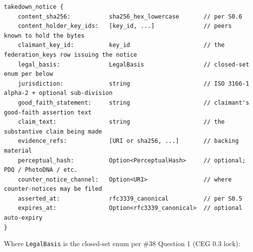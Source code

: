 \documentclass[11pt]{article}
\begin{document}
\begin{lstlisting}
takedown_notice {
    content_sha256:           sha256_hex_lowercase       // per S0.6
    content_holder_key_ids:   [key_id, ...]              // peers known to hold the bytes
    claimant_key_id:          key_id                     // the federation_keys row issuing the notice
    legal_basis:              LegalBasis                 // closed-set enum per below
    jurisdiction:             string                     // ISO 3166-1 alpha-2 + optional sub-division
    good_faith_statement:     string                     // claimant's good-faith assertion text
    claim_text:               string                     // the substantive claim being made
    evidence_refs:            [URI or sha256, ...]       // backing material
    perceptual_hash:          Option<PerceptualHash>     // optional; PDQ / PhotoDNA / etc.
    counter_notice_channel:   Option<URI>                // where counter-notices may be filed
    asserted_at:              rfc3339_canonical          // per S0.5
    expires_at:               Option<rfc3339_canonical>  // optional auto-expiry
}
\end{lstlisting}

Where \texttt{LegalBasis} is the closed-set enum per \#38 Question 1 (CEG 0.3 lock):
\end{document}
